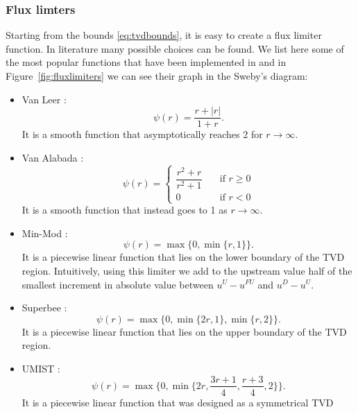 \subsubsection{Flux limters}
Starting from the bounds \eqref{eq:tvdbounds}, it is easy to create a 
flux limiter function. In literature many possible choices can be 
found. 
We list here some of the most popular functions that have been implemented in 
\DUMUX and in Figure~\ref{fig:fluxlimiters} we can see their graph in the 
Sweby's diagram:
\begin{itemize}
	\item Van Leer \cite{tvd:vanleer}:
	\begin{equation} \label{eq:vl}
	\psi(r) = \frac{r+|r|}{1+r}.
	\end{equation}
	It is a smooth function that asymptotically reaches 2 for $r \rightarrow 
	\infty$.
%
	\item Van Alabada \cite{tvd:vanalabada}:
	\begin{equation} \label{eq:vanalabada}
	\psi(r)=
	\begin{cases}
	\dfrac{r^2+r}{r^2+1} \quad &\text{if $r\geq 0$}\\[2ex]
	0 \quad &\text{if $r<0$}
	\end{cases}
	\end{equation}
	It is a smooth function that instead goes to 1 as $r \rightarrow \infty$.
%
	\item Min-Mod \cite{tvd:roe}:
	\begin{equation} \label{eq:minmod}
	\psi(r) = \max \{0, \min \{ r,1\} \}.
	\end{equation}
	It is a piecewise linear function that lies on the lower boundary of the 
	TVD region. Intuitively, using this limiter we add to the upstream value  
	half of	the smallest increment in absolute value between $u^U-u^{FU}$ and 
	$u^D - u^U$.
%
	\item Superbee \cite{tvd:roe}:
	\begin{equation} \label{eq:superbee}
	\psi(r)=\max \{0, \min \{ 2r, 1\}, \min \{ r, 2\} \}.
	\end{equation}
	It is a piecewise linear function that lies on the upper boundary of the 
	TVD region.
%
	\item UMIST \cite{tvd:lien}:
	\begin{equation} \label{eq:umist}
	\psi(r)=\max \bigg\{0, \min \bigg\{ 2r, \frac{3r+1}{4},\frac{r+3}{4}, 
	2\bigg\} \bigg\}.
	\end{equation}
	It is a piecewise linear function that was designed as a symmetrical TVD 

\end{itemize}

